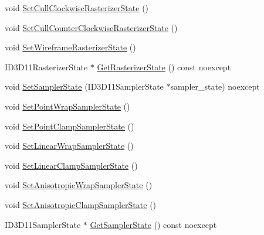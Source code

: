 \begin{DoxyCompactItemize}
void \hyperlink{structmage_1_1_rendering_state_a707034239265916d82e7dbe168f09cb6}{Set\+Cull\+Clockwise\+Rasterizer\+State} ()
\item 
void \hyperlink{structmage_1_1_rendering_state_aa66215168ce8752ef20065b161bad1fc}{Set\+Cull\+Counter\+Clockwise\+Rasterizer\+State} ()
\item 
void \hyperlink{structmage_1_1_rendering_state_a392b339b24950c71bfc7285bcca5eacf}{Set\+Wireframe\+Rasterizer\+State} ()
\item 
I\+D3\+D11\+Rasterizer\+State $\ast$ \hyperlink{structmage_1_1_rendering_state_a46b7f58a95f8029598d8354fdf02840f}{Get\+Rasterizer\+State} () const noexcept
\item 
void \hyperlink{structmage_1_1_rendering_state_a3829b0bd0eaedc664542481445ab226b}{Set\+Sampler\+State} (I\+D3\+D11\+Sampler\+State $\ast$sampler\+\_\+state) noexcept
\item 
void \hyperlink{structmage_1_1_rendering_state_ab8cebd05d1b01ec22f311aa0f1c1dc7e}{Set\+Point\+Wrap\+Sampler\+State} ()
\item 
void \hyperlink{structmage_1_1_rendering_state_aabf9e70b12cb12560e6c6c880bbc08ca}{Set\+Point\+Clamp\+Sampler\+State} ()
\item 
void \hyperlink{structmage_1_1_rendering_state_a6ffd109271b4988fa6d4a6fc2daa2125}{Set\+Linear\+Wrap\+Sampler\+State} ()
\item 
void \hyperlink{structmage_1_1_rendering_state_a4f414c7bed884194bd93d89f893c86b4}{Set\+Linear\+Clamp\+Sampler\+State} ()
\item 
void \hyperlink{structmage_1_1_rendering_state_a92318b9b250555ca1d6b516d49371abc}{Set\+Anisotropic\+Wrap\+Sampler\+State} ()
\item 
void \hyperlink{structmage_1_1_rendering_state_a52b80c58015fb64f0b8afa7712807ccd}{Set\+Anisotropic\+Clamp\+Sampler\+State} ()
\item 
I\+D3\+D11\+Sampler\+State $\ast$ \hyperlink{structmage_1_1_rendering_state_a72a0817f0041d49af156f8115347460d}{Get\+Sampler\+State} () const noexcept
\end{DoxyCompactItemize}
